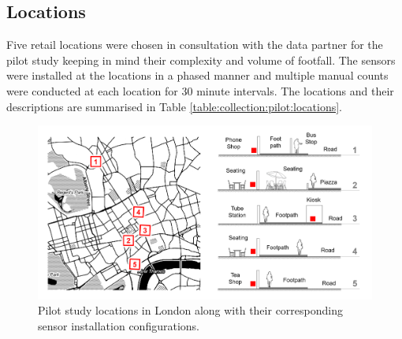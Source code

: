 \subsection{Locations}

Five retail locations were chosen in consultation with the data partner for the pilot study keeping in mind their complexity and volume of footfall.
The sensors were installed at the locations in a phased manner and multiple manual counts were conducted at each location for 30 minute intervals.
The locations and their descriptions are summarised in Table \ref{table:collection:pilot:locations}.

\begin{figure}
  \centering
  \includegraphics[trim={20 20 20 20},clip, width=\textwidth]{images/pilot-study-locations.png}
  \caption{Pilot study locations in London along with their corresponding sensor installation configurations.}
  \label{figure:literature:tech:timeline}
\end{figure}

